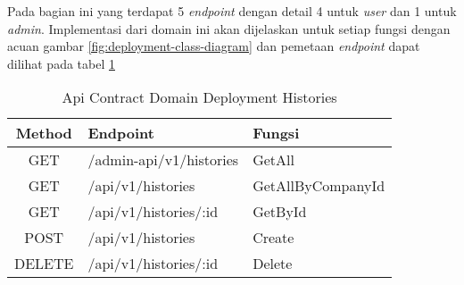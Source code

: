 Pada bagian ini yang terdapat 5 \textit{endpoint} dengan detail 4 untuk \textit{user} dan 1 untuk \textit{admin}. Implementasi dari domain ini akan dijelaskan untuk setiap fungsi dengan acuan gambar \ref{fig:deployment-class-diagram} dan pemetaan \textit{endpoint} dapat dilihat pada tabel \ref{tab:api-contract-domain-deployment-histories}

\bgroup
\begin{table}[ht]
  \caption{Api Contract Domain Deployment Histories}
  \label{tab:api-contract-domain-deployment-histories}
  \def\arraystretch{1.7}
  \centering
  \begin{tabular}{|c|p{6cm}|p{4cm}|}
    \hline
    Method & Endpoint                &
    Fungsi                                               \\
    \hline
    GET    & /admin-api/v1/histories & GetAll            \\
    \hline
    GET    & /api/v1/histories       & GetAllByCompanyId \\
    \hline
    GET    & /api/v1/histories/:id   & GetById           \\
    \hline
    POST   & /api/v1/histories       & Create            \\
    \hline
    DELETE & /api/v1/histories/:id   & Delete            \\
    \hline
  \end{tabular}
\end{table}
\egroup


